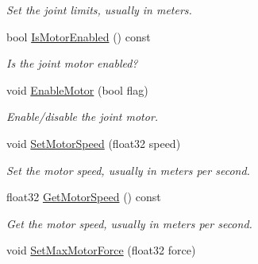 \begin{DoxyCompactItemize}
\begin{DoxyCompactList}\small\item\em Set the joint limits, usually in meters. \end{DoxyCompactList}\item 
bool \hyperlink{classb2_prismatic_joint_a236650664554a4d81f8644e9a9d19c65}{Is\+Motor\+Enabled} () const \hypertarget{classb2_prismatic_joint_a236650664554a4d81f8644e9a9d19c65}{}\label{classb2_prismatic_joint_a236650664554a4d81f8644e9a9d19c65}

\begin{DoxyCompactList}\small\item\em Is the joint motor enabled? \end{DoxyCompactList}\item 
void \hyperlink{classb2_prismatic_joint_a4a7fd079de49f7ed5aa4a5d8d90be2a2}{Enable\+Motor} (bool flag)\hypertarget{classb2_prismatic_joint_a4a7fd079de49f7ed5aa4a5d8d90be2a2}{}\label{classb2_prismatic_joint_a4a7fd079de49f7ed5aa4a5d8d90be2a2}

\begin{DoxyCompactList}\small\item\em Enable/disable the joint motor. \end{DoxyCompactList}\item 
void \hyperlink{classb2_prismatic_joint_a602ef7a6ca4fca55d011f1b38ab5a6c3}{Set\+Motor\+Speed} (float32 speed)\hypertarget{classb2_prismatic_joint_a602ef7a6ca4fca55d011f1b38ab5a6c3}{}\label{classb2_prismatic_joint_a602ef7a6ca4fca55d011f1b38ab5a6c3}

\begin{DoxyCompactList}\small\item\em Set the motor speed, usually in meters per second. \end{DoxyCompactList}\item 
float32 \hyperlink{classb2_prismatic_joint_a20f969fefb08d86728bd1f0cf03e121f}{Get\+Motor\+Speed} () const \hypertarget{classb2_prismatic_joint_a20f969fefb08d86728bd1f0cf03e121f}{}\label{classb2_prismatic_joint_a20f969fefb08d86728bd1f0cf03e121f}

\begin{DoxyCompactList}\small\item\em Get the motor speed, usually in meters per second. \end{DoxyCompactList}\item 
void \hyperlink{classb2_prismatic_joint_aa7817474aef15ca4815341479ac590e2}{Set\+Max\+Motor\+Force} (float32 force)\hypertarget{classb2_prismatic_joint_aa7817474aef15ca4815341479ac590e2}{}\label{classb2_prismatic_joint_aa7817474aef15ca4815341479ac590e2}


\end{DoxyCompactItemize}
